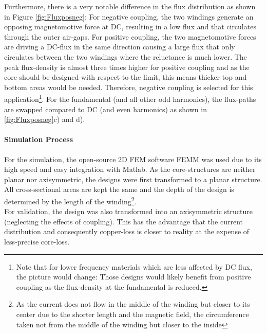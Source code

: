 \documentclass{IPEC2026}
\newcommand{\sbl}[1]{\glssymbol{#1}}
\begin{document}
Furthermore, there is a very notable difference in the flux distribution as shown in Figure \ref{fig:Fluxposneg}: For negative coupling, the two windings generate an opposing magnetomotive force at DC, resulting in a low flux and that circulates through the outer air-gaps. For positive coupling, the two magnetomotive forces are driving a DC-flux in the same direction causing a large flux that only circulates between the two windings where the reluctance is much lower. The peak flux-density is almost three times higher for positive coupling and as the core should be designed with respect to the \sbl{Hdc} limit, this means thicker top and bottom areas would be needed. Therefore, negative coupling is selected for this application\footnote{Note that for lower frequency materials which are less affected by DC flux, the picture would change: Those designs would likely benefit from positive coupling as the flux-density at the fundamental is reduced.}. For the fundamental (and all other odd harmonics), the flux-paths are swapped compared to DC (and even harmonics) as shown in \ref{fig:Fluxposneg}c) and d).

\paragraph{Simulation Process}
For the simulation, the open-source 2D FEM software FEMM was used due to its high speed and easy integration with Matlab. As the core-structures are neither planar nor axisymmetric, the designs were first transformed to a planar structure. All cross-sectional areas are kept the same and the depth of the design is determined by the length of the winding\footnote{As the current does not flow in the middle of the winding but closer to its center due to the shorter length and the magnetic field, the circumference taken not from the middle of the winding but closer to the inside}. \\
For validation, the design was also transformed into an axisymmetric structure (neglecting the effects of coupling). This has the advantage that the current distribution and consequently copper-loss is closer to reality at the expense of less-precise core-loss.
\end{document}
